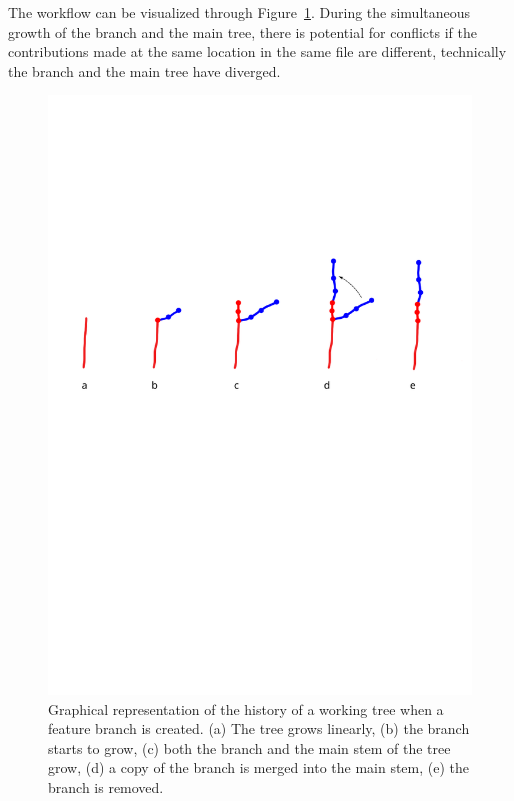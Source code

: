 \documentclass[10pt]{article}
\begin{document}
The workflow can be visualized through Figure~\ref{fig:feature-happy-path}. 
During the simultaneous growth of the branch and the main tree, there is potential for conflicts if the contributions made at the same location in the same file are different, technically the branch and the main tree have diverged.

\begin{figure}
    \centering
    \includegraphics[width=\textwidth]{images/featurebranch_happy_path.png}
    \caption{Graphical representation of the history of a working tree when a feature branch is created. (a) The tree grows linearly, (b) the branch starts to grow, (c) both the branch and the main stem of the tree grow, (d) a copy of the branch is merged into the main stem, (e) the branch is removed.}
    \label{fig:feature-happy-path}
\end{figure}
\end{document}
